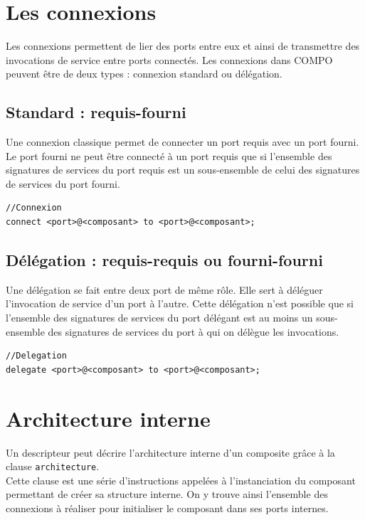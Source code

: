 \documentclass[11pt,a4paper,openany,oneside]{book}
\begin{document}
\section{Les connexions}

Les connexions permettent de lier des ports entre eux et ainsi de transmettre des invocations de service entre ports connectés.
Les connexions dans COMPO peuvent être de deux types : connexion standard ou délégation.

\subsection{Standard : requis-fourni}

Une connexion classique permet de connecter un port requis avec un port fourni. Le port fourni ne peut être connecté à un port requis que si l'ensemble des signatures de services du port requis est un sous-ensemble de celui des signatures de services du port fourni.

\begin{lstlisting}[language=Compo, frame=single, caption=Syntaxe de la connexion]
//Connexion
connect <port>@<composant> to <port>@<composant>; 
\end{lstlisting}

\subsection{Délégation : requis-requis ou fourni-fourni}
Une délégation se fait entre deux port de même rôle. Elle sert à déléguer l'invocation de service d'un port à l'autre. Cette délégation n'est possible que si l'ensemble des signatures de services du port délégant est au moins un sous-ensemble des signatures de services du port à qui on délègue les invocations.

\begin{lstlisting}[language=Compo, frame=single, caption=Syntaxe de la délégation]
//Delegation
delegate <port>@<composant> to <port>@<composant>;
\end{lstlisting}

\section{Architecture interne}

Un descripteur peut décrire l'architecture interne d'un composite grâce à la clause \texttt{architecture}.\\
Cette clause est une série d'instructions appelées à l'instanciation du composant permettant de créer sa structure interne. On y trouve ainsi l'ensemble des connexions à réaliser pour initialiser le composant dans ses ports internes.
\end{document}
